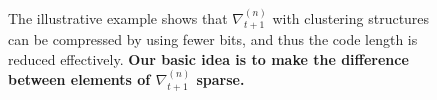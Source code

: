 \documentclass[journal]{IEEEtran}
\begin{document}
\begin{figure}[!t]
\caption{The illustrative example shows that $\nabla_{t+1}^{(n)}$ with clustering structures can be compressed by using fewer bits, and thus the code length is reduced effectively. \textbf{Our basic idea is to make the difference between  elements of $\nabla_{t+1}^{(n)}$ sparse.}}
\label{figure_intro_gradient_clustering}
\end{figure}
\end{document}
